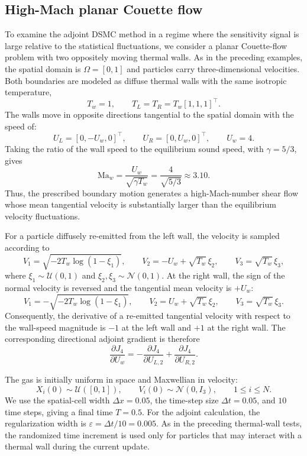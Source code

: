 \documentclass[12pt,nopreprintline]{elsarticle}
\begin{document}
{

\subsection{High-Mach planar Couette flow}\label{subsec:test4}

To examine the adjoint DSMC method in a regime where the sensitivity signal is large relative to the statistical fluctuations, we consider a planar Couette-flow problem with two oppositely moving thermal walls. As in the preceding examples, the spatial domain is $\Omega=[0,1]$ and particles carry three-dimensional velocities. Both boundaries are modeled as diffuse thermal walls with the same isotropic temperature,
\[
T_w=1,\qquad T_L=T_R=T_w[1,1,1]^\top.
\]
The walls move in opposite directions tangential to the spatial domain with the speed of:
\[
U_L=[0,-U_w,0]^\top,
\qquad
U_R=[0,U_w,0]^\top,
\qquad U_w=4.
\]
Taking the ratio of the wall speed to the equilibrium sound speed, with $\gamma=5/3$, gives
\[
\mathrm{Ma}_w
=
\frac{U_w}{\sqrt{\gamma T_w}}
=
\frac{4}{\sqrt{5/3}}
\approx 3.10.
\]
Thus, the prescribed boundary motion generates a high-Mach-number shear flow whose mean tangential velocity is substantially larger than the equilibrium velocity fluctuations.

For a particle diffusely re-emitted from the left wall, the velocity is sampled according to
\[
V_1=\sqrt{-2T_w\log(1-\xi_1)},\qquad V_2=-U_w+\sqrt{T_w}\,\xi_2,\qquad V_3=\sqrt{T_w}\,\xi_3,
\]
where $\xi_1\sim\mathcal U(0,1)$ and $\xi_2,\xi_3\sim\mathcal N(0,1)$. At the right wall, the sign of the normal velocity is reversed and the tangential mean velocity is $+U_w$:
\[
V_1=-\sqrt{-2T_w\log(1-\xi_1)},\qquad V_2=U_w+\sqrt{T_w}\,\xi_2,\qquad V_3=\sqrt{T_w}\,\xi_3.
\]
Consequently, the derivative of a re-emitted tangential velocity with respect to the wall-speed magnitude is $-1$ at the left wall and $+1$ at the right wall. The corresponding directional adjoint gradient is therefore
\[
\frac{\partial J_4}{\partial U_w}
= -\frac{\partial J_4}{\partial U_{L,2}} +\frac{\partial J_4}{\partial U_{R,2}}.
\]

The gas is initially uniform in space and Maxwellian in velocity:
\[
X_i(0)\sim\mathcal U([0,1]),
\qquad
V_i(0)\sim\mathcal N(0,I_3),
\qquad 1\leq i\leq N.
\]
We use the spatial-cell width $\Delta x=0.05$, the time-step size $\Delta t=0.05$, and $10$ time steps, giving a final time $T=0.5$. For the adjoint calculation, the regularization width is $\varepsilon=\Delta t/10=0.005$. As in the preceding thermal-wall tests, the randomized time increment is used only for particles that may interact with a thermal wall during the current update.

}
\end{document}
